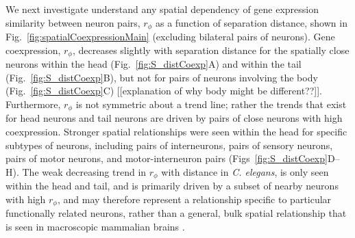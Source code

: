 \documentclass[10pt,letterpaper]{article}
\begin{document}

We next investigate understand any spatial dependency of gene expression similarity between neuron pairs, $r_\phi$ as a function of separation distance, shown in Fig.~\ref{fig:spatialCoexpressionMain} (excluding bilateral pairs of neurons).
Gene coexpression, $r_\phi$, decreases slightly with separation distance for the spatially close neurons within the head (Fig.~\ref{fig:S_distCoexp}A) and within the tail (Fig.~\ref{fig:S_distCoexp}B), but not for pairs of neurons involving the body (Fig.~\ref{fig:S_distCoexp}C) [[explanation of why body might be different??]].
Furthermore, $r_\phi$ is not symmetric about a trend line; rather the trends that exist for head neurons and tail neurons are driven by pairs of close neurons with high coexpression.
Stronger spatial relationships were seen within the head for specific subtypes of neurons, including pairs of interneurons, pairs of sensory neurons, pairs of motor neurons, and motor-interneuron pairs (Figs~\ref{fig:S_distCoexp}D--H).
The weak decreasing trend in $r_\phi$ with distance in \emph{C. elegans}, is only seen within the head and tail, and is primarily driven by a subset of nearby neurons with high $r_\phi$, and may therefore represent a relationship specific to particular functionally related neurons, rather than a general, bulk spatial relationship that is seen in macroscopic mammalian brains \cite{Fulcher:2016ck}.
\end{document}
